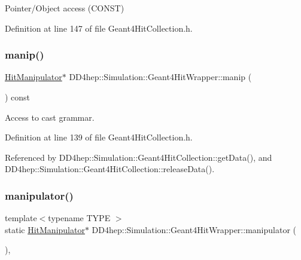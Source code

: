 Pointer/\+Object access (C\+O\+N\+ST) 



Definition at line 147 of file Geant4\+Hit\+Collection.\+h.

\hypertarget{class_d_d4hep_1_1_simulation_1_1_geant4_hit_wrapper_a0a47f87785a7cc9af60ab9a0f21dcf44}{}\label{class_d_d4hep_1_1_simulation_1_1_geant4_hit_wrapper_a0a47f87785a7cc9af60ab9a0f21dcf44} 
\subsubsection{\texorpdfstring{manip()}{manip()}}
{\footnotesize\ttfamily \hyperlink{class_d_d4hep_1_1_simulation_1_1_geant4_hit_wrapper_1_1_hit_manipulator}{Hit\+Manipulator}$\ast$ D\+D4hep\+::\+Simulation\+::\+Geant4\+Hit\+Wrapper\+::manip (\begin{DoxyParamCaption}{ }\end{DoxyParamCaption}) const\hspace{0.3cm}{\ttfamily [inline]}}



Access to cast grammar. 



Definition at line 139 of file Geant4\+Hit\+Collection.\+h.



Referenced by D\+D4hep\+::\+Simulation\+::\+Geant4\+Hit\+Collection\+::get\+Data(), and D\+D4hep\+::\+Simulation\+::\+Geant4\+Hit\+Collection\+::release\+Data().

\hypertarget{class_d_d4hep_1_1_simulation_1_1_geant4_hit_wrapper_a332101c195da46df30565b5285904d27}{}\label{class_d_d4hep_1_1_simulation_1_1_geant4_hit_wrapper_a332101c195da46df30565b5285904d27} 
\subsubsection{\texorpdfstring{manipulator()}{manipulator()}}
{\footnotesize\ttfamily template$<$typename T\+Y\+PE $>$ \\
static \hyperlink{class_d_d4hep_1_1_simulation_1_1_geant4_hit_wrapper_1_1_hit_manipulator}{Hit\+Manipulator}$\ast$ D\+D4hep\+::\+Simulation\+::\+Geant4\+Hit\+Wrapper\+::manipulator (\begin{DoxyParamCaption}{ }\end{DoxyParamCaption})\hspace{0.3cm}{\ttfamily [inline]}, {\ttfamily [static]}}



